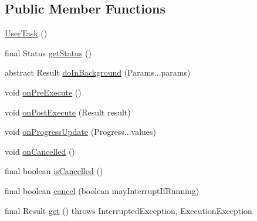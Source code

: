 \subsection*{Public Member Functions}
\begin{DoxyCompactItemize}
\item 
\hyperlink{classcom_1_1cellbots_1_1communication_1_1_user_task_3_01_params_00_01_progress_00_01_result_01_4_ad6e99e8d228daef6a7ece12157939b0d}{User\-Task} ()
\item 
final Status \hyperlink{classcom_1_1cellbots_1_1communication_1_1_user_task_3_01_params_00_01_progress_00_01_result_01_4_ac4ce48eea3fce0d3b19d4eddc6ebf0b7}{get\-Status} ()
\item 
abstract Result \hyperlink{classcom_1_1cellbots_1_1communication_1_1_user_task_3_01_params_00_01_progress_00_01_result_01_4_a86139461a6fc31539ed614e1d0ba221b}{do\-In\-Background} (Params...\-params)
\item 
void \hyperlink{classcom_1_1cellbots_1_1communication_1_1_user_task_3_01_params_00_01_progress_00_01_result_01_4_a607ca1af80fbed865758fc2d65251484}{on\-Pre\-Execute} ()
\item 
void \hyperlink{classcom_1_1cellbots_1_1communication_1_1_user_task_3_01_params_00_01_progress_00_01_result_01_4_a78c489752f4b23d6ab9973cea78ae0e4}{on\-Post\-Execute} (Result result)
\item 
void \hyperlink{classcom_1_1cellbots_1_1communication_1_1_user_task_3_01_params_00_01_progress_00_01_result_01_4_a7ee2ad0a6e1ec5fc6ba1f34897888a95}{on\-Progress\-Update} (Progress...\-values)
\item 
void \hyperlink{classcom_1_1cellbots_1_1communication_1_1_user_task_3_01_params_00_01_progress_00_01_result_01_4_a2a8c552d0235bef67c82476ffc8f40db}{on\-Cancelled} ()
\item 
final boolean \hyperlink{classcom_1_1cellbots_1_1communication_1_1_user_task_3_01_params_00_01_progress_00_01_result_01_4_a7aaef3fd3b63b168ac9d7c84bb784e31}{is\-Cancelled} ()
\item 
final boolean \hyperlink{classcom_1_1cellbots_1_1communication_1_1_user_task_3_01_params_00_01_progress_00_01_result_01_4_a7b9b699b449873617e122bb9a526b4f3}{cancel} (boolean may\-Interrupt\-If\-Running)
\item 
final Result \hyperlink{classcom_1_1cellbots_1_1communication_1_1_user_task_3_01_params_00_01_progress_00_01_result_01_4_a18d4242688edcbf73d6dcf8333049062}{get} ()  throws Interrupted\-Exception, Execution\-Exception 
\item 

\end{DoxyCompactItemize}

